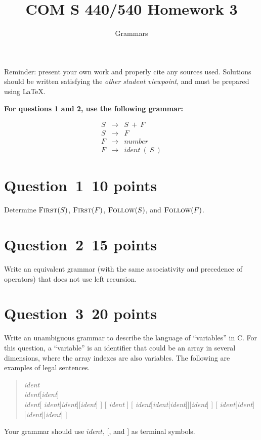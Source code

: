 \documentclass[10pt]{article}
\title{COM S 440/540 Homework 3}
\date{}
\author{Grammars}
\renewcommand{\thepage}{~}
\begin{document}
\maketitle

\noindent
Reminder: present your own work and properly cite any sources used.
Solutions should be written satisfying the \emph{other student viewpoint},
and must be prepared using \LaTeX.
\renewcommand{\thepage}{~}
 
\noindent 
{\bf For questions 1 and 2, use the following grammar:}
 

\begin{eqnarray}
  S & \rightarrow & S ~+~ F
\\
  S & \rightarrow & F
\\
  F & \rightarrow & \mathit{number}
\\
  F & \rightarrow & \mathit{ident} ~(~ S ~)
\end{eqnarray}


\section*{Question~1~\hfill 10 points}

Determine $\textsc{First}(S)$, $\textsc{First}(F)$, $\textsc{Follow}(S)$, and $\textsc{Follow}(F)$.


\section*{Question~2~\hfill 15 points}

Write an equivalent grammar (with the same associativity and precedence
of operators) that does not use left recursion.


\section*{Question~3~\hfill 20 points}

Write an unambiguous grammar to describe the language of 
``variables'' in C.
For this question, a ``variable'' is an identifier
that could be an array in several dimensions,
where the array indexes are also variables.
The following are examples of legal sentences.
\begin{quote}
  \emph{ident} \\
  \emph{ident}[\emph{ident}] \\
  \emph{ident}[ \emph{ident}[\emph{ident}][\emph{ident}] ]
  [ \emph{ident} ]
  [ \emph{ident}[\emph{ident}[\emph{ident}]][\emph{ident}] ]
  [ \emph{ident}[\emph{ident}][\emph{ident}][\emph{ident}] ]
\end{quote}
Your grammar should use $\mathit{ident}$, $[$, and $]$ as
terminal symbols.
\end{document}
